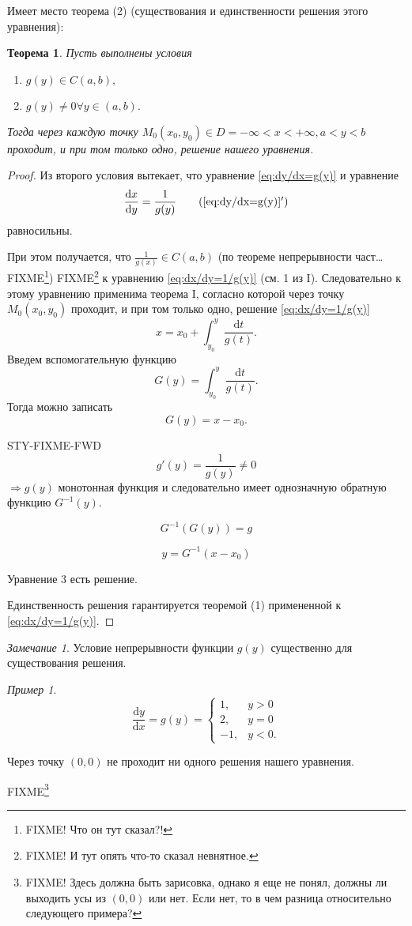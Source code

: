 \documentclass[a4paper,10pt]{report}
\newcommand{\ud}{\mathrm{d}}
\newtheorem{theorem}{Теорема}[section]
\theoremstyle{definition}
\theoremstyle{remark}
\newtheorem{note}{Замечание}[section]
\newtheorem{example}{Пример}[section]
\theoremstyle{plain}
\begin{document}
Имеет место теорема (2) (существования и единственности решения этого уравнения):
\begin{theorem}
 Пусть выполнены условия
 \begin{enumerate}
  \item $g(y) \in C(a,b),$
  \item $g(y) \ne 0 \forall y \in (a,b).$
 \end{enumerate}
 Тогда через каждую точку $M_0(x_0,y_0) \in D = {-\infty < x < +\infty, a < y < b}$ проходит, и при том только одно, решение нашего уравнения.
\end{theorem}
\begin{proof}
 Из второго условия вытекает, что уравнение \eqref{eq:dy/dx=g(y)} и уравнение
 \begin{equation}
  \frac{\ud x}{\ud y} = \frac{1}{g(y)}
  \tag{\ref*{eq:dy/dx=g(y)}$'$}
  \label{eq:dx/dy=1/g(y)}
 \end{equation}
 равносильны.

 При этом получается, что $\frac{1}{g(x)} \in C(a,b)$ (по теореме непрерывности част\ldots FIXME\footnote{FIXME! Что он тут сказал?!}) FIXME\footnote{FIXME! И тут опять что-то сказал невнятное.} к уравнению \eqref{eq:dx/dy=1/g(y)} (см. 1 из I). Следовательно к этому уравнению применима теорема I, согласно которой через точку $M_0(x_0,y_0)$ проходит, и при том только одно, решение \eqref{eq:dx/dy=1/g(y)}
 \[
  x = x_0 + \int_{y_0}^y \frac{\ud t}{g(t)}.
 \]
 Введем вспомогательную функцию
 \[
  G(y) = \int_{y_0}^{y} \frac{\ud t}{g(t)}.
 \]
 Тогда можно записать
 \[
  G(y) = x-x_0.
 \]

 STY-FIXME-FWD
 \[
  g'(y) = \frac{1}{g(y)} \ne 0
 \]
 $\Longrightarrow g(y)$ монотонная функция и следовательно имеет однозначную обратную функцию $G^{-1}(y)$.

 \[
  G^{-1}(G(y)) = g
 \]

 \begin{equation}
  y = G^{-1}(x-x_0)
 \end{equation}

 Уравнение 3 есть решение.

 Единственность решения гарантируется теоремой (1) примененной к \eqref{eq:dx/dy=1/g(y)}.
\end{proof}
\begin{note}
 Условие непрерывности функции $g(y)$ существенно для существования решения.
\end{note}
\begin{example}
 \begin{equation*}
  \frac{\ud y}{\ud x} = g(y) = \begin{cases}
   1, & y > 0 \\
   2, & y = 0 \\
   -1, & y < 0.
  \end{cases}
 \end{equation*}

 Через точку $(0,0)$ не проходит ни одного решения нашего уравнения.

 FIXME\footnote{FIXME! Здесь должна быть зарисовка, однако я еще не понял, должны ли выходить усы из $(0,0)$ или нет. Если нет, то в чем разница относительно следующего примера?}
\end{example}
\end{document}
